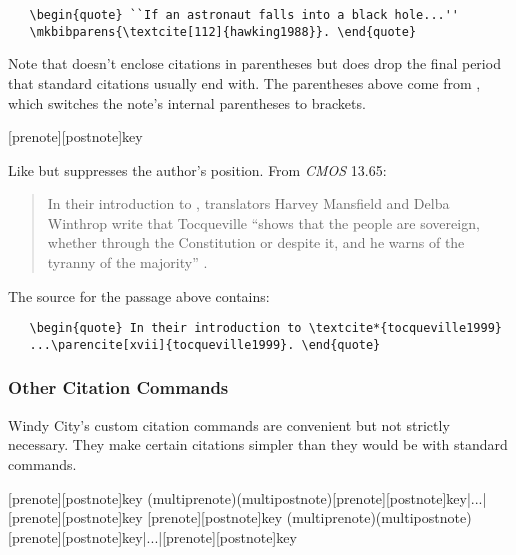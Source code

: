 \documentclass[11pt,letterpaper,oneside]{article}
\begin{document}
\begin{ltxsyntax}
\begin{verbatim}
   \begin{quote} ``If an astronaut falls into a black hole...''
   \mkbibparens{\textcite[112]{hawking1988}}. \end{quote}
\end{verbatim}

Note that  doesn't enclose citations in parentheses but
does drop the final period that standard citations usually end with.
The parentheses above come from , which switches the
note's internal parentheses to brackets.

[prenote][postnote]{key}

Like  but suppresses the author's position. From
\textit{CMOS} 13.65:

\begin{quote} In their introduction to \textcite*{tocqueville1999},
translators Harvey Mansfield and Delba Winthrop write that Tocqueville
``shows that the people are sovereign, whether through the
Constitution or despite it, and he warns of the tyranny of the
majority'' \parencite[xvii]{tocqueville1999}. \end{quote}

The source for the passage above contains:

\begin{verbatim}
   \begin{quote} In their introduction to \textcite*{tocqueville1999}
   ...\parencite[xvii]{tocqueville1999}. \end{quote}
\end{verbatim}

\end{ltxsyntax}

\subsubsection{Other Citation Commands}
\label{cust.cmd}

Windy City's custom citation commands are convenient but not strictly
necessary. They make certain citations simpler than they would be with
standard commands.

\begin{ltxsyntax}
[prenote][postnote]{key}
(multiprenote)(multipostnote)[prenote][postnote]{key}|...|[prenote][postnote]{key}
[prenote][postnote]{key}
(multiprenote)(multipostnote)[prenote][postnote]{key}|...|[prenote][postnote]{key}
\end{ltxsyntax}
\end{document}
